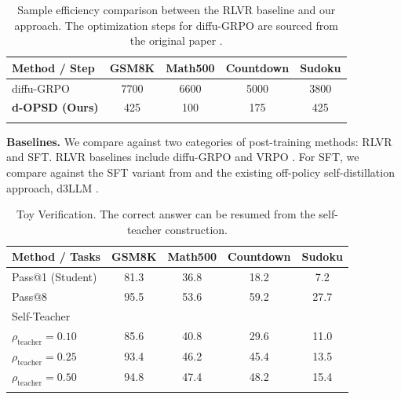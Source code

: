 \documentclass{article}
\begin{document}
\begin{table}
\vspace{-18pt}
\setlength{\tabcolsep}{4pt}
\centering
\caption{Sample efficiency comparison between the RLVR baseline and our approach. The optimization steps for diffu-GRPO are sourced from the original paper \citep{zhao2025d1}.}
\begin{tabular}{lcccc}
\toprule
\textbf{Method / Step} & \textbf{GSM8K} & \textbf{Math500} & \textbf{Countdown} & \textbf{Sudoku} \\
\midrule
diffu-GRPO & 7700 & 6600 & 5000 & 3800 \\
\textbf{d-OPSD (Ours)} & \cellcolor{lightblue} 425 & \cellcolor{lightblue}  100 & \cellcolor{lightblue}  175 & \cellcolor{lightblue}  425\\
\bottomrule
\label{tab3}
\end{tabular}
\vspace{-15pt}
\end{table}

\textbf{Baselines. } We compare against two categories of post-training methods: RLVR and SFT. RLVR baselines include diffu-GRPO \citep{zhao2025d1} and VRPO \citep{zhu2025llada}. For SFT, we compare against the SFT variant from \citep{zhao2025d1} and the existing off-policy self-distillation approach, d3LLM \citep{qian2026d3llm}.

\begin{table}
\vspace{-15pt}
\setlength{\tabcolsep}{4pt}
\centering
\caption{Toy Verification. The correct answer can be resumed from the self-teacher construction.}
\small
\begin{tabular}{lcccc}
\toprule
\textbf{Method / Tasks} & \textbf{GSM8K} & \textbf{Math500} & \textbf{Countdown} & \textbf{Sudoku} \\
\midrule
Pass@1 (Student) & 81.3 & 36.8 & 18.2 & 7.2 \\
Pass@8 & 95.5 & 53.6 & 59.2 & 27.7\\
Self-Teacher \\
\quad $\rho_\text{teacher} = 0.10 $ & 85.6 & 40.8 & 29.6 & 11.0 \\
\quad $\rho_\text{teacher} = 0.25 $ & 93.4 & 46.2 & 45.4 & 13.5 \\
\quad $\rho_\text{teacher} = 0.50 $ & 94.8 & 47.4 & 48.2 & 15.4 \\
\bottomrule
\label{tab1}
\end{tabular}
\vspace{-15pt}
\end{table}
\end{document}
